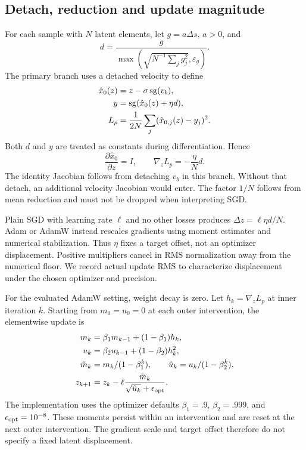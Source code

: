 \subsection{Detach, reduction and update magnitude}
For each sample with $N$ latent elements, let $g=a\Delta s$, $a>0$, and
\begin{equation}
d=\frac{g}{\max(\sqrt{N^{-1}\sum_jg_j^2},\varepsilon_g)}.
\end{equation}
The primary branch uses a detached velocity to define
\begin{align}
\hat x_0(z)&=z-\sigma\operatorname{sg}(v_b),\\
y&=\operatorname{sg}(\hat x_0(z)+\eta d),\\
L_p&=\frac{1}{2N}\sum_j(\hat x_{0,j}(z)-y_j)^2.
\end{align}
Both $d$ and $y$ are treated as constants during differentiation. Hence
\begin{equation}
\frac{\partial\hat x_0}{\partial z}=I,
\qquad\nabla_zL_p=-\frac{\eta}{N}d.
\end{equation}
The identity Jacobian follows from detaching $v_b$ in this branch. Without
that detach, an additional velocity Jacobian would enter. The factor $1/N$
follows from mean reduction and must not be dropped when interpreting SGD.

Plain SGD with learning rate $\ell$ and no other losses produces
$\Delta z=\ell\eta d/N$. Adam or AdamW instead rescales gradients using
moment estimates and numerical stabilization. Thus $\eta$ fixes a target
offset, not an optimizer displacement. Positive multipliers cancel in RMS
normalization away from the numerical floor. We record actual update RMS
to characterize displacement under the chosen optimizer and precision.

For the evaluated AdamW setting, weight decay is zero. Let
$h_k=\nabla_zL_p$ at inner iteration $k$. Starting from $m_0=u_0=0$ at each
outer intervention, the elementwise update is
\begin{align}
m_k&=\beta_1m_{k-1}+(1-\beta_1)h_k,\\
u_k&=\beta_2u_{k-1}+(1-\beta_2)h_k^2,\\
\hat m_k&=m_k/(1-\beta_1^k),\qquad
\hat u_k=u_k/(1-\beta_2^k),\\
z_{k+1}&=z_k-\ell\frac{\hat m_k}{\sqrt{\hat u_k}+\epsilon_{\rm opt}}.
\end{align}
The implementation uses the optimizer defaults
$\beta_1=.9$, $\beta_2=.999$, and $\epsilon_{\rm opt}=10^{-8}$.
These moments persist within an intervention and are reset at the next
outer intervention. The gradient scale and target offset therefore do not
specify a fixed latent displacement.

